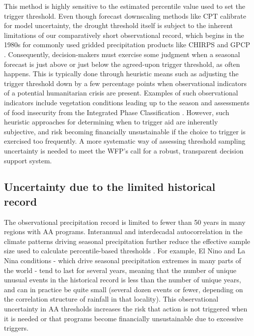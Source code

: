 \documentclass{ametsocV6.1}
\begin{document}
This method is highly sensitive to the estimated percentile value used to set the trigger threshold. Even though forecast downscaling methods like CPT calibrate for model uncertainty, the drought threshold itself is subject to the inherent limitations of our comparatively short observational record, which begins in the 1980s for commonly used gridded precipitation products like CHIRPS \citep{funk_climate_2015} and GPCP \citep{huffman_improving_2009}. Consequently, decision-makers must exercise some judgment when a seasonal forecast is just above or just below the agreed-upon trigger threshold, as often happens. This is typically done through heuristic means such as adjusting the trigger threshold down by a few percentage points when observational indicators of a potential humanitarian crisis are present. Examples of such observational indicators include vegetation conditions leading up to the season and assessments of food insecurity from the Integrated Phase Classification \citep{funk_recognizing_2019}. However, such heuristic approaches for determining when to trigger aid are inherently subjective, and risk becoming financially unsustainable if the choice to trigger is exercised too frequently. A more systematic way of assessing threshold sampling uncertainty is needed to meet the WFP's call for a robust, transparent decision support system. 

\subsection{Uncertainty due to the limited historical record}

The observational precipitation record is limited to fewer than 50 years in many regions with AA programs. Interannual and interdecadal autocorrelation in the climate patterns driving seasonal precipitation further reduce the effective sample size used to calculate percentile-based thresholds \citep{martinez_seasonal_2022}. For example, El Nino and La Nina conditions - which drive seasonal precipitation extremes in many parts of the world - tend to last for several years, meaning that the number of unique unusual events in the historical record is less than the number of unique years, and can in practice be quite small (several dozen events or fewer, depending on the correlation structure of rainfall in that locality). This observational uncertainty in AA thresholds increases the risk that action is not triggered when it is needed or that programs become financially unsustainable due to excessive triggers. 
\end{document}
